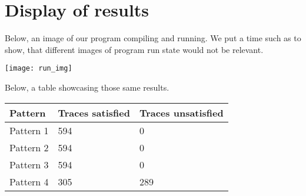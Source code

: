 \section*{Display of results}

Below, an image of our program compiling and running. We put a time such as to show, that different
images of program run state would not be relevant.

\begin{center}
    \texttt{[image: run\_img]}
\end{center}	

Below, a table showcasing those same results.

\begin{center}
    \begin{tabular}{| l | l | l |}
    \hline
    Pattern & Traces satisfied & Traces unsatisfied \\ \hline
    Pattern 1 & 594 & 0 \\ \hline
    Pattern 2 & 594 & 0 \\ \hline
    Pattern 3 & 594 & 0 \\ \hline
    Pattern 4 & 305 & 289 \\ \hline
    \end{tabular}	
\end{center}	
